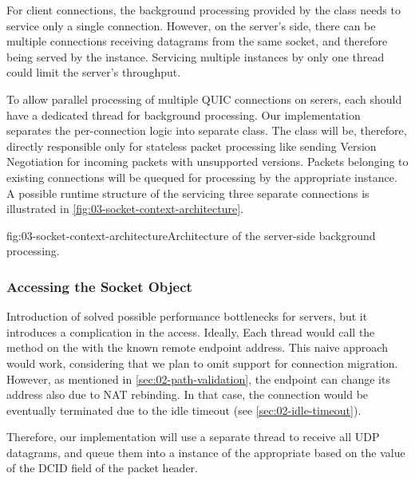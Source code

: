 For client connections, the background processing provided by the \QuicSocketContext{} class needs
to service only a single connection. However, on the server's side, there can be multiple
connections receiving datagrams from the same socket, and therefore being served by the
\QuicSocketContext{} instance. Servicing multiple \QuicConnection{} instances by only one thread
could limit the server's throughput.

To allow parallel processing of multiple QUIC connections on serers, each \QuicConnection{} should
have a dedicated thread for background processing. Our implementation separates the per-connection
logic into separate \QuicConnectionContext{} class. The \QuicSocketContext{} class will be,
therefore, directly responsible only for stateless packet processing like sending Version
Negotiation for incoming packets with unsupported versions. Packets belonging to existing
connections will be quequed for processing by the appropriate \QuicConnectionContext{} instance. A
possible runtime structure of the \QuicSocketContext{} servicing three separate connections is
illustrated in \autoref{fig:03-socket-context-architecture}.

\begin{myFigure}{fig:03-socket-context-architecture}{Architecture of the server-side background processing.}
\end{myFigure}

\subsubsection{Accessing the Socket Object}

Introduction of \QuicConnectionContext{} solved possible performance bottlenecks for servers, but it
introduces a complication in the \Socket{} access. Ideally, Each thread would call the
 method on the \Socket{} with the known remote endpoint address. This
naive approach would work, considering that we plan to omit support for connection migration.
However, as mentioned in \autoref{sec:02-path-validation}, the endpoint can change its address also
due to NAT rebinding. In that case, the connection would be eventually terminated due to the idle
timeout (see \autoref{sec:02-idle-timeout}).

Therefore, our implementation will use a separate thread to receive all UDP datagrams, and queue
them into a  instance of the appropriate \QuicConnectionContext{} based on the
value of the DCID field of the packet header.

